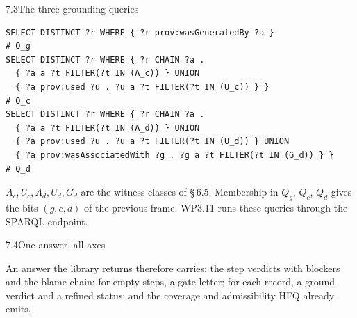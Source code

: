 \documentclass[aspectratio=169,11pt]{beamer}
\newcommand{\codesize}{\fontsize{8.7}{10.1}\selectfont}
\newcommand{\vl}[1]{\texttt{\detokenize{#1}}}
\begin{document}
\begin{frame}[fragile]{7.3\quad The three grounding queries}
\begin{Verbatim}[fontsize=\codesize]
SELECT DISTINCT ?r WHERE { ?r prov:wasGeneratedBy ?a }                   # Q_g
SELECT DISTINCT ?r WHERE { ?r CHAIN ?a .
  { ?a a ?t FILTER(?t IN (A_c)) } UNION
  { ?a prov:used ?u . ?u a ?t FILTER(?t IN (U_c)) } }                      # Q_c
SELECT DISTINCT ?r WHERE { ?r CHAIN ?a .
  { ?a a ?t FILTER(?t IN (A_d)) } UNION
  { ?a prov:used ?u . ?u a ?t FILTER(?t IN (U_d)) } UNION
  { ?a prov:wasAssociatedWith ?g . ?g a ?t FILTER(?t IN (G_d)) } }        # Q_d
\end{Verbatim}
\footnotesize
$A_c, U_c, A_d, U_d, G_d$ are the witness classes of \S\,6.5. Membership in $Q_g$, $Q_c$, $Q_d$ gives the
bits $(g,c,d)$ of the previous frame. WP3.11 runs these queries through the SPARQL endpoint.
\end{frame}

\begin{frame}{7.4\quad One answer, all axes}
\centering
{}
\par\bigskip
\raggedright\footnotesize
An answer the library returns therefore carries: the step verdicts with blockers and the blame chain; for empty
steps, a gate letter; for each record, a ground verdict and a refined status; and the coverage and
admissibility HFQ already emits.
\end{frame}
\end{document}
